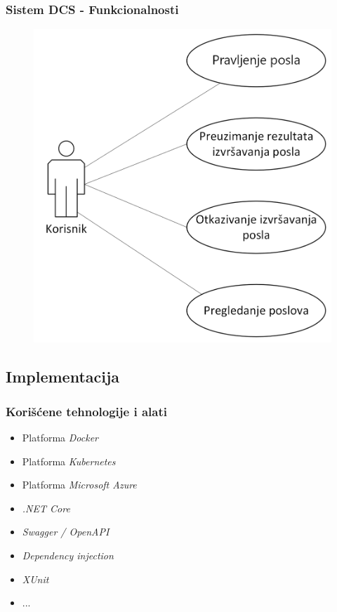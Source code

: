\documentclass[11pt]{beamer}
\begin{document}
\begin{frame}
	\frametitle{Sistem DCS - Funkcionalnosti}

	\begin{figure}
		\includegraphics[width=0.55\linewidth]{./images/dijagram_slucajeva_upotrebe_korisnik.png}
	\end{figure}
	
\end{frame}


\subsection{Implementacija}

\begin{frame}
	\frametitle{Korišćene tehnologije i alati}

	\begin{itemize}
		\item Platforma \emph{Docker}
		\item Platforma \emph{Kubernetes}
		\item Platforma \emph{Microsoft Azure}
		\item \emph{.NET Core}
		\item \emph{Swagger / OpenAPI}
		\item \emph{Dependency injection}
		\item \emph{XUnit}
		\item ...
	\end{itemize}

\end{frame}

\end{document}
